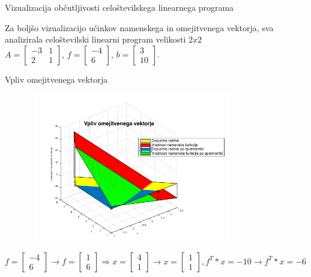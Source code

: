 \documentclass[t]{beamer}
\begin{document}
\begin{frame}{Vizualizacija občutljivosti celoštevilskega linearnega programa}
\begin{center}
Za boljšo vizualizacijo učinkov namenskega in omejitvenega vektorja, sva analizirala celoštevilski linearni program velikosti $2x2$
\\[0.5cm]
$ A = \begin{bmatrix}
  -3 & 1  \\
  2 & 1   
\end{bmatrix} $, $f=\begin{bmatrix} -4 \\ 6\end{bmatrix}$, $b=\begin{bmatrix} 3 \\ 10 \end{bmatrix}.$
\end{center}
\end{frame}

\begin{frame}{Vpliv omejitvenega vektorja}
\begin{center}
\begin{figure}[h]
\includegraphics[width=9.1cm,height=6.5cm]{viz1.png}
\end{figure}
$f=\begin{bmatrix} -4 \\ 6 \end{bmatrix} \to f=\begin{bmatrix} 1 \\ 6\end{bmatrix} \Rightarrow x=\begin{bmatrix} 4 \\ 1 \end{bmatrix} \to x=\begin{bmatrix} 1 \\ 1\end{bmatrix} , f^T*x=-10 \to f^T*x=-6$
\end{center}
\end{frame}
\end{document}
